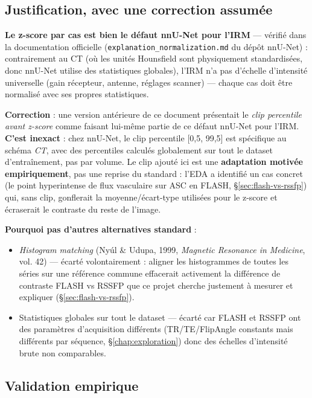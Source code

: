 \subsection{Justification, avec une correction assumée}

\textbf{Le z-score par cas est bien le défaut nnU-Net pour l'IRM} --- vérifié dans la
documentation officielle (\texttt{explanation\_normalization.md} du dépôt nnU-Net) :
contrairement au CT (où les unités Hounsfield sont physiquement standardisées, donc
nnU-Net utilise des statistiques globales), l'IRM n'a pas d'échelle d'intensité
universelle (gain récepteur, antenne, réglages scanner) --- chaque cas doit être
normalisé avec ses propres statistiques.

\textbf{Correction} : une version antérieure de ce document présentait le \emph{clip
percentile avant z-score} comme faisant lui-même partie de ce défaut nnU-Net pour
l'IRM. \textbf{C'est inexact} : chez nnU-Net, le clip percentile [0,5, 99,5] est
spécifique au schéma \emph{CT}, avec des percentiles calculés globalement sur tout le
dataset d'entraînement, pas par volume. Le clip ajouté ici est une
\textbf{adaptation motivée empiriquement}, pas une reprise du standard : l'EDA a
identifié un cas concret (le point hyperintense de flux vasculaire sur ASC en FLASH,
\S\ref{sec:flash-vs-rssfp}) qui, sans clip, gonflerait la moyenne/écart-type utilisées
pour le z-score et écraserait le contraste du reste de l'image.

\textbf{Pourquoi pas d'autres alternatives standard} :
\begin{itemize}[nosep]
    \item \emph{Histogram matching} (Nyúl \& Udupa, 1999, \emph{Magnetic Resonance in
        Medicine}, vol. 42) --- écarté volontairement : aligner les histogrammes de
        toutes les séries sur une référence commune effacerait activement la différence
        de contraste FLASH vs RSSFP que ce projet cherche justement à mesurer et
        expliquer (\S\ref{sec:flash-vs-rssfp}).
    \item Statistiques globales sur tout le dataset --- écarté car FLASH et RSSFP ont
        des paramètres d'acquisition différents (TR/TE/FlipAngle constants mais
        différents par séquence, \S\ref{chap:exploration}) donc des échelles
        d'intensité brute non comparables.
\end{itemize}

\subsection{Validation empirique}


